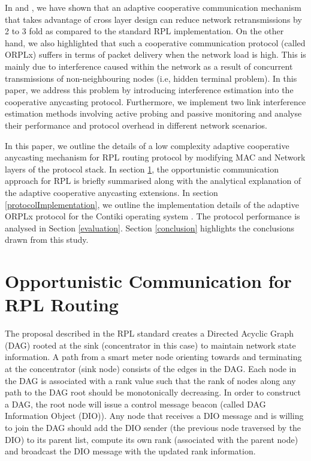 \documentclass[conference]{IEEEtran}
\begin{document}
In \cite{orpl} and \cite{orpl-tpds}, we have shown that an adaptive cooperative communication mechanism that takes advantage of cross layer design can reduce network retransmissions by 2 to 3 fold as compared to the standard RPL implementation. On the other hand, we also highlighted that such a cooperative communication protocol (called ORPLx) suffers in terms of packet delivery  when the network load is high. This is mainly due to interference caused within the network as a result of concurrent transmissions of non-neighbouring nodes (i.e, hidden terminal problem). In this paper, we address this problem by introducing interference estimation into the cooperative anycasting protocol. Furthermore, we implement two link interference estimation methods involving active probing and passive monitoring and analyse their performance and protocol overhead in different network scenarios.

In this paper, we outline the details of a low complexity adaptive cooperative anycasting mechanism
for RPL routing protocol by modifying MAC and Network layers of the protocol stack. In section \ref{protocolOutline}, the opportunistic communication approach for RPL is briefly summarised along with the analytical explanation of the adaptive cooperative anycasting extensions. In section \ref{protocolImplementation}, we outline the implementation details of the adaptive ORPLx protocol for the Contiki operating system \cite{contiki}. The protocol performance is analysed in Section \ref{evaluation}. Section \ref{conclusion} highlights the conclusions drawn from this study.



















\section{Opportunistic Communication for RPL Routing}\label{protocolOutline}




The proposal described in the RPL standard \cite{draft-ietf-rpl}
creates a Directed Acyclic Graph (DAG) rooted at the sink
(concentrator in this case) to maintain network state information. A
path from a smart meter node orienting towards and terminating at
the concentrator (sink node) consists of the edges in the DAG. Each
node in the DAG is associated with a rank value such that the rank
of nodes along any path to the DAG root should be monotonically
decreasing. In order to construct a DAG, the root node will issue a
control message beacon (called DAG Information Object (DIO)).
Any node that receives a DIO message and is willing to join the DAG
should add the DIO sender (the previous node traversed by the DIO)
to its parent list, compute its own rank (associated with the parent
node) and broadcast the DIO message with the updated rank
information.
\end{document}
